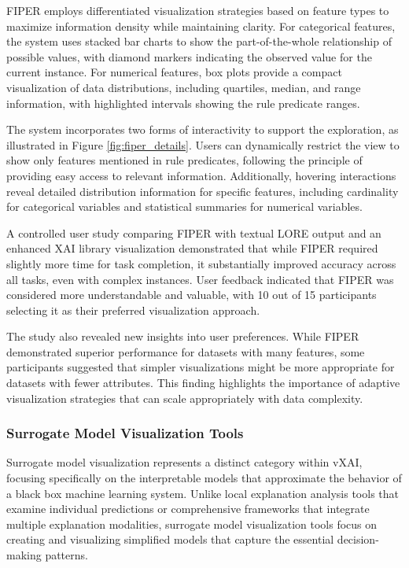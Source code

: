 FIPER employs differentiated visualization strategies based on feature types to maximize information density while maintaining clarity. For categorical features, the system uses stacked bar charts to show the part-of-the-whole relationship of possible values, with diamond markers indicating the observed value for the current instance. For numerical features, box plots provide a compact visualization of data distributions, including quartiles, median, and range information, with highlighted intervals showing the rule predicate ranges.

The system incorporates two forms of interactivity to support the exploration, as illustrated in Figure \ref{fig:fiper_details}. Users can dynamically restrict the view to show only features mentioned in rule predicates, following the principle of providing easy access to relevant information. Additionally, hovering interactions reveal detailed distribution information for specific features, including cardinality for categorical variables and statistical summaries for numerical variables.

A controlled user study comparing FIPER with textual LORE output and an enhanced XAI library visualization demonstrated 
that while FIPER required slightly more time for task completion, it substantially improved accuracy across all tasks, even with complex instances. User feedback indicated that FIPER was considered more understandable and valuable, with 10 out of 15 participants selecting it as their preferred visualization approach.

The study also revealed new insights into user preferences. While FIPER demonstrated superior performance for datasets with many features, some participants suggested that simpler visualizations might be more appropriate for datasets with fewer attributes. This finding highlights the importance of adaptive visualization strategies that can scale appropriately with data complexity.

\subsubsection{Surrogate Model Visualization Tools}

Surrogate model visualization represents a distinct category within vXAI, focusing specifically on the interpretable models that approximate the behavior of a black box machine learning system. Unlike local explanation analysis tools that examine individual predictions or comprehensive frameworks that integrate multiple explanation modalities, surrogate model visualization tools focus on creating and visualizing simplified models that capture the essential decision-making patterns.

